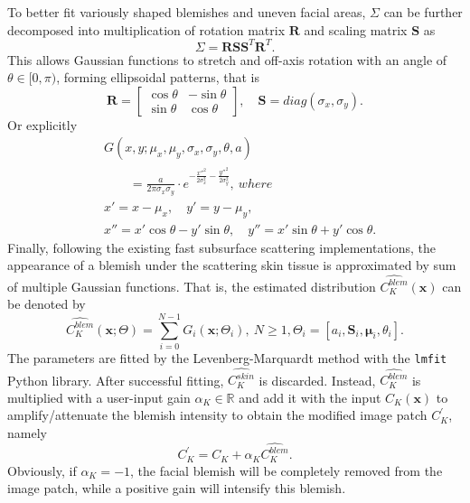 \begin{spacing}{1.5}
To better fit variously shaped blemishes and uneven facial areas, $\Sigma$ can be further decomposed into multiplication of rotation matrix $\mathbf{R}$ and scaling matrix $\mathbf{S}$ as
\begin{equation}
    \Sigma= \mathbf{R}\mathbf{S}\mathbf{S}^T\mathbf{R}^T.
\end{equation}
This allows Gaussian functions to stretch and off-axis rotation with an angle of $\theta\in[0,\pi)$, forming ellipsoidal patterns, that is
\begin{equation}
  \mathbf{R} = \begin{bmatrix}
    \cos\theta & -\sin\theta \\
    \sin\theta & \cos\theta
  \end{bmatrix},\quad\mathbf{S}=diag(\sigma_x,\sigma_y).
\end{equation}
Or explicitly
\begin{equation}
    \begin{aligned}
         & G(x, y; \mu_x, \mu_y, \sigma_x, \sigma_y, \theta, a)\\
         & \qquad=\frac{a}{2\pi \sigma_x \sigma_y}\cdot e^{-\frac{{x''^2}}{{2 \sigma_x^2}} - \frac{{y''^2}}{{2 \sigma_y^2}}},\ where \\
         & x'=x - \mu_x, \quad y'=y - \mu_y, \\
         & x'' = x' \cos\theta - y' \sin\theta,\quad y'' = x' \sin\theta + y' \cos\theta.
    \end{aligned}
\end{equation}
Finally, following the existing fast subsurface scattering implementations, the appearance of a blemish under the scattering skin tissue is approximated by sum of multiple Gaussian functions. That is, the estimated distribution $\hat{C_K^{blem}}(\mathbf{x})$ can be denoted by
\begin{equation}
  \hat{C_K^{blem}}(\mathbf{x}; \Theta)=\sum_{i=0}^{N-1}G_i(\mathbf{x}; \Theta_i),\ N\ge1, \Theta_i=\left[a_i, \mathbf{S}_i, \mathbf{\mu}_i, \theta_i\right].
\end{equation}
The parameters are fitted by the Levenberg-Marquardt method\cite{10.1007/BFb0067700} with the \texttt{lmfit} Python library\cite{newville_matthew_2014_11813}. After successful fitting, $\hat{C_K^{skin}}$ is discarded. Instead, $\hat{C_K^{blem}}$ is multiplied with a user-input gain $\alpha_K\in\mathbb{R}$ and add it with the input $C_K(\mathbf{x})$ to amplify/attenuate the blemish intensity to obtain the modified image patch $C_K^{\prime}$, namely
\begin{equation}
  C_K^{\prime} = C_K+\alpha_K\hat{C_K^{blem}}.
  \label{eqn:alpha}
\end{equation}
Obviously, if $\alpha_K=-1$, the facial blemish will be completely removed from the image patch, while a positive gain will intensify this blemish.


\end{spacing}
